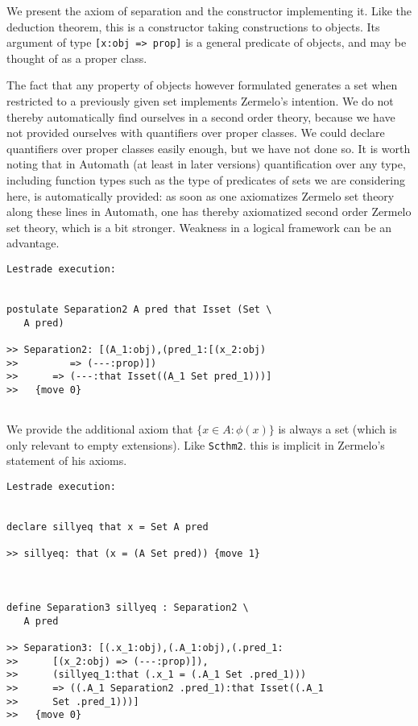 \documentclass[12pt]{article}
\begin{document}
We present the axiom of separation and the constructor implementing it.  Like the deduction theorem, this is a constructor taking constructions to objects.
Its argument of type {\tt [x:obj => prop]} is a general predicate of objects, and may be thought of as a proper class.

The fact that any property of objects however formulated generates a set when restricted to a previously given set implements Zermelo's intention.  We do not thereby automatically find ourselves in a second order theory, because we have not provided ourselves with quantifiers over proper classes.  We could declare quantifiers over proper classes easily enough, but we have not done so.  It is worth noting that in Automath (at least in later versions) quantification over any type, including function types such as the type of predicates of sets we are considering here, is automatically provided:  as soon as one axiomatizes Zermelo set theory along these lines in Automath, one has thereby axiomatized second order Zermelo set theory, which is a bit stronger.  Weakness in a logical framework can be an advantage.

\begin{verbatim}Lestrade execution:


postulate Separation2 A pred that Isset (Set \
   A pred)

>> Separation2: [(A_1:obj),(pred_1:[(x_2:obj)
>>         => (---:prop)])
>>      => (---:that Isset((A_1 Set pred_1)))]
>>   {move 0}


\end{verbatim}

We provide the additional axiom that $\{x \in A:\phi(x)\}$ is always a set (which is only relevant to empty extensions).  Like {\tt Scthm2}. this is implicit in Zermelo's statement of his axioms.

\begin{verbatim}Lestrade execution:


declare sillyeq that x = Set A pred

>> sillyeq: that (x = (A Set pred)) {move 1}



define Separation3 sillyeq : Separation2 \
   A pred

>> Separation3: [(.x_1:obj),(.A_1:obj),(.pred_1:
>>      [(x_2:obj) => (---:prop)]),
>>      (sillyeq_1:that (.x_1 = (.A_1 Set .pred_1)))
>>      => ((.A_1 Separation2 .pred_1):that Isset((.A_1
>>      Set .pred_1)))]
>>   {move 0}


\end{verbatim}
\end{document}

